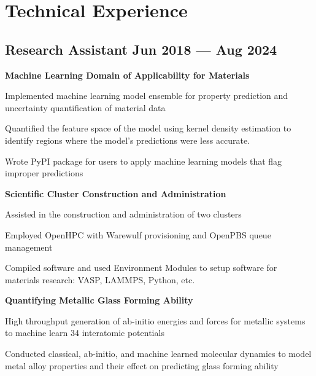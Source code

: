 \section{Technical Experience}

\subsection{{Research Assistant \hfill Jun 2018 --- Aug 2024}}
\begin{zitemize}
\item[] \textbf{Machine Learning Domain of Applicability for Materials}
    \begin{zitemize}
    \item Implemented machine learning model ensemble for property prediction and uncertainty quantification of material data
    \item Quantified the feature space of the model using kernel density estimation to identify regions where the model's predictions were less accurate.
    \item Wrote PyPI package for users to apply machine learning models that flag improper predictions
    \end{zitemize}
\item[] \textbf{Scientific Cluster Construction and Administration}
    \begin{zitemize}
    \item Assisted in the construction and administration of two clusters
    \item Employed OpenHPC with Warewulf provisioning and OpenPBS queue management
    \item Compiled software and used Environment Modules to setup software for materials research: VASP, LAMMPS, Python, etc.
    \end{zitemize}
\item[] \textbf{Quantifying Metallic Glass Forming Ability}
    \begin{zitemize}
    \item High throughput generation of ab-initio energies and forces for metallic systems to machine learn 34 interatomic potentials
    \item Conducted classical, ab-initio, and machine learned molecular dynamics to model metal alloy properties and their effect on predicting glass forming ability
    \end{zitemize}
\end{zitemize}

